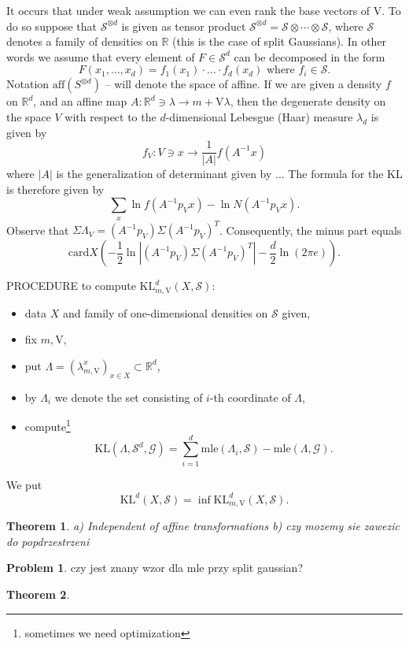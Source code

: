\documentclass[12pt]{article}
\def\R{\mathbb{R}}
\def\v{\mathrm{V}}
\def\G{\mathcal{G}}
\def\S{\mathcal{S}}
\def\KL{\mathrm{KL}}
\def\mle{\mathrm{mle}}
\def\card{\mathrm{card}}
\def\aff{\mathrm{aff}}
\newtheorem{theorem}{Theorem}[section]
\theoremstyle{definition}
\newtheorem{problem}{Problem}[section]
\begin{document}
	 It occurs that under weak assumption we can even rank the base vectors of $\v$. To do so suppose that $\S^{\otimes d}$ is given as tensor product 
$\S^{\otimes d}=\S \otimes \cdots \otimes \S$, where $\S$ denotes a family of densities on $\R$
(this is the case of split Gaussians). 
In other words we assume that every element of $F \in \S^d$ can be decomposed in the form 
$$
F(x_1,\ldots,x_d)=f_1(x_1) \cdot \ldots \cdot f_d(x_d)\text{ where }f_i \in \S.
$$
Notation $\aff(S^{\otimes d})$ -- will denote the space of affine. If we are given
a density $f$ on $\R^d$, and an affine map $A:\R^d \ni \lambda \to m+\v \lambda$, then
the degenerate density on the space $V$ with respect to the $d$-dimensional Lebesgue (Haar) measure  $\lambda_d$ is given by
$$
f_V:V \ni x \to \frac{1}{|A|}f(A^{-1}x)
$$
where $|A|$ is the generalization of determinant given by ... 
The formula for the KL is therefore given by
$$
\sum_x \ln f(A^{-1}p_Vx) -\ln N(A^{-1}p_Vx).
$$
Observe that $\Sigma \Lambda_V=(A^{-1}p_V)\Sigma(A^{-1}p_V)^T$.
Consequently, the minus part equals
$$
\card X(-\frac{1}{2}\ln |(A^{-1}p_V)\Sigma(A^{-1}p_V)^T|-\frac{d}{2}\ln(2\pi e)).
$$

PROCEDURE to compute $\KL^d_{m,\v}(X,\S)$:
\begin{itemize}
\item data $X$ and family of one-dimensional densities on $\S$ given,
\item fix $m,\v$,
\item put $\Lambda=(\lambda_{m,\v}^x)_{x \in X} \subset \R^d$,
\item by $\Lambda_i$ we denote the set consisting of $i$-th coordinate of $\Lambda$,
\item compute\footnote{sometimes we need optimization}
$$
\KL(\Lambda,\S^d,\G)=\sum_{i=1}^d \mle(\Lambda_i,\S)-\mle(\Lambda,\G).
$$
\end{itemize}

We put
$$
\KL^d(X,\S)=\inf \KL^d_{m,\v}(X,\S).
$$

\begin{theorem}
a) Independent of affine transformations b) czy mozemy sie zawezic do popdrzestrzeni
\end{theorem}

\begin{problem}
czy jest znany wzor dla mle przy split gaussian?
\end{problem}

\begin{theorem}

\end{theorem}
\end{document}
